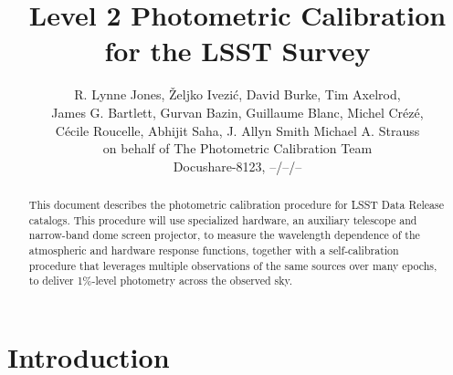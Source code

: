 \documentclass[12pt,preprint]{aastex}
\begin{document}
\title{Level 2 Photometric Calibration for the LSST Survey}

\author{
R. Lynne Jones, {\v Z}eljko Ivezi{\'c}, David Burke, Tim Axelrod, \\
James G. Bartlett, 
Gurvan Bazin,
Guillaume Blanc, 
Michel Cr{\'e}z{\'e}, \\ 
C{\'e}cile Roucelle, 
Abhijit Saha, 
J. Allyn Smith
Michael A. Strauss \\
on behalf of 
The Photometric Calibration Team \\ 
Docushare-8123, --/--/-- \\
}



\begin{abstract}
This document describes the photometric calibration procedure for LSST
Data Release catalogs. This procedure will use specialized hardware, 
an auxiliary telescope and narrow-band dome screen projector, to
measure the wavelength dependence of the atmospheric and hardware
response functions, together with a self-calibration procedure that
leverages multiple observations of the same sources over many epochs,
to deliver 1\%-level photometry across the observed sky.
\end{abstract}

\tableofcontents

\section{Introduction}
\end{document}
